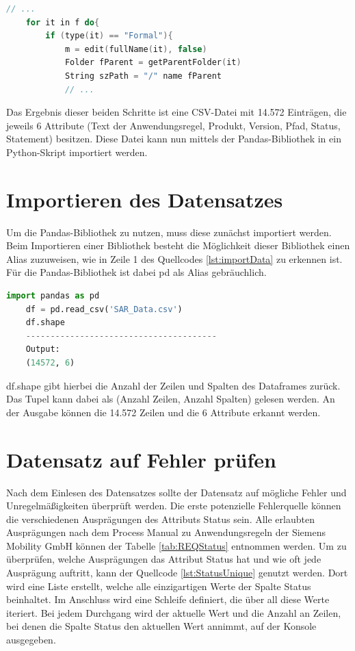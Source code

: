 \begin{lstlisting}[language = C++, caption={Projektnamen bestimmen},captionpos=b, label = lst:getPath, float, floatplacement=H]
    // ...
    for it in f do{
        if (type(it) == "Formal"){
            m = edit(fullName(it), false)
            Folder fParent = getParentFolder(it)
            String szPath = "/" name fParent
            // ...
\end{lstlisting}

Das Ergebnis dieser beiden Schritte ist eine CSV-Datei mit 14.572 Einträgen, die jeweils 6 Attribute (Text der Anwendungsregel, Produkt, Version, Pfad, Status, Statement) besitzen.
Diese Datei kann nun mittels der Pandas-Bibliothek in ein Python-Skript importiert werden.

\section{Importieren des Datensatzes}
Um die Pandas-Bibliothek zu nutzen, muss diese zunächst importiert werden. Beim Importieren einer Bibliothek besteht die Möglichkeit dieser Bibliothek einen Alias zuzuweisen,
wie in Zeile 1 des Quellcodes \ref*{lst:importData} zu erkennen ist. Für die Pandas-Bibliothek ist dabei pd als Alias gebräuchlich.

\begin{lstlisting}[language = python, caption={Pandas und den Datensatz importieren},captionpos=b, label = lst:importData, floatplacement=H]
    import pandas as pd
    df = pd.read_csv('SAR_Data.csv')
    df.shape
    ---------------------------------------
    Output:
    (14572, 6)
\end{lstlisting}

df.shape gibt hierbei die Anzahl der Zeilen und Spalten des Dataframes zurück. Das Tupel kann dabei als (Anzahl Zeilen, Anzahl Spalten) gelesen werden.
An der Ausgabe können die 14.572 Zeilen und die 6 Attribute erkannt werden.

\section{Datensatz auf Fehler prüfen}
Nach dem Einlesen des Datensatzes sollte der Datensatz auf mögliche Fehler und Unregelmäßigkeiten überprüft werden. 
Die erste potenzielle Fehlerquelle können die verschiedenen Ausprägungen des Attributs Status sein. Alle erlaubten Ausprägungen nach dem 
Process Manual zu Anwendungsregeln der Siemens Mobility GmbH können der Tabelle \ref*{tab:REQStatus} entnommen werden. Um zu überprüfen, welche Ausprägungen
das Attribut Status hat und wie oft jede Ausprägung auftritt, kann der Quellcode \ref*{lst:StatusUnique} genutzt werden. Dort wird eine Liste erstellt,
welche alle einzigartigen Werte der Spalte Status beinhaltet. Im Anschluss wird eine Schleife definiert, die über all diese Werte iteriert.
Bei jedem Durchgang wird der aktuelle Wert und die Anzahl an Zeilen, bei denen die Spalte Status den aktuellen Wert annimmt, auf der Konsole ausgegeben.

